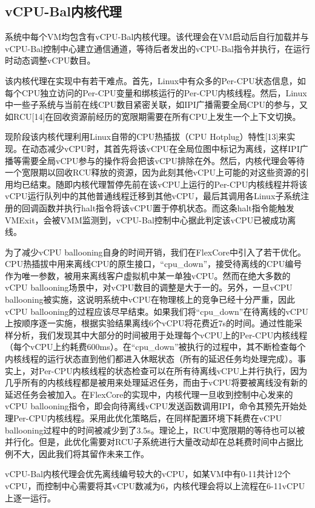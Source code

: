 \subsection{vCPU-Bal内核代理}

系统中每个VM均包含有vCPU-Bal内核代理。该代理会在VM启动后自行加载并与vCPU-Bal控制中心建立通信通道，等待后者发出的vCPU-Bal指令并执行，在运行时动态调整vCPU数目。

该内核代理在实现中有若干难点。首先，Linux中有众多的Per-CPU状态信息，如每个CPU独立访问的Per-CPU变量和绑核运行的Per-CPU内核线程。然后，Linux中一些子系统与当前在线CPU数目紧密关联，如IPI广播需要全局CPU的参与，又如RCU[14]在回收资源前经历的宽限期需要在所有CPU上发生一个上下文切换。

现阶段该内核代理利用Linux自带的CPU热插拔（CPU Hotplug）特性[13]来实现。在动态减少vCPU时，其首先将该vCPU在全局位图中标记为离线，这样IPI广播等需要全局vCPU参与的操作将会把该vCPU排除在外。然后，内核代理会等待一个宽限期以回收RCU释放的资源，因为此刻其他vCPU上可能的对这些资源的引用均已结束。随即内核代理暂停先前在该vCPU上运行的Per-CPU内核线程并将该vCPU运行队列中的其他普通线程迁移到其他vCPU，最后其调用各Linux子系统注册的回调函数并执行halt指令将该vCPU置于停机状态。而这条halt指令能触发VMExit，会被VMM监测到，vCPU-Bal控制中心据此判定该vCPU已被成功离线。

为了减少vCPU ballooning自身的时间开销，我们在FlexCore中引入了若干优化。CPU热插拔中用来离线CPU的原生接口，``cpu\_down''，接受待离线的CPU编号作为唯一参数，被用来离线客户虚拟机中某一单独vCPU。然而在绝大多数的vCPU ballooning场景中，对vCPU数目的调整是大于一的。另外，一旦vCPU ballooning被实施，这说明系统中vCPU在物理核上的竞争已经十分严重，因此vCPU ballooning的过程应该尽早结束。如果我们将``cpu\_down''在待离线的vCPU上按顺序逐一实施，根据实验结果离线6个vCPU将花费近7s的时间。通过性能采样分析，我们发现其中大部分的时间被用于处理每个vCPU上的Per-CPU内核线程（每个vCPU上约耗费600ms）。在``cpu\_down''被执行的过程中，其不断检查每个内核线程的运行状态直到他们都进入休眠状态（所有的延迟任务均处理完成）。事实上，对Per-CPU内核线程的状态检查可以在所有待离线vCPU上并行执行，因为几乎所有的内核线程都是被用来处理延迟任务，而由于vCPU将要被离线没有新的延迟任务会被加入。在FlexCore的实现中，内核代理一旦收到控制中心发来的vCPU ballooning指令，即会向待离线vCPU发送函数调用IPI，命令其预先开始处理Per-CPU内核线程。采用此优化策略后，在同样配置环境下耗费在vCPU ballooning过程中的时间被减少到了3.5s。理论上，RCU中宽限期的等待也可以被并行化。但是，此优化需要对RCU子系统进行大量改动却在总耗费时间中占据比例不大，因此我们将其留作未来工作。

vCPU-Bal内核代理会优先离线编号较大的vCPU，如某VM中有0-11共计12个vCPU，而控制中心需要将其vCPU数减为6，内核代理会将以上流程在6-11vCPU上逐一运行。

